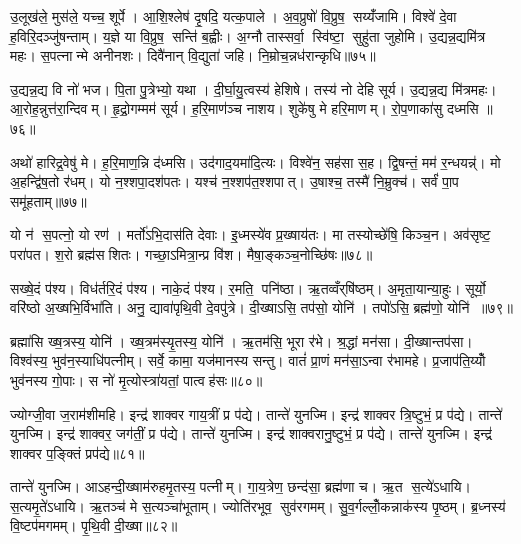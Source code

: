 उ॒लूख॑ले॒ मुस॑ले॒ यच्च॒ शूर्पे। आ॒शि॒श्लेष॑ दृ॒षदि॒ यत्क॒पाले। अ॒व॒प्रुषो॑ वि॒प्रुष॒ सय्यँ॑जामि। विश्वे॑ दे॒वा ह॒विरि॒दञ्जु॑षन्ताम्। य॒ज्ञे या वि॒प्रुष॒ सन्ति॑ ब॒ह्वीः। अ॒ग्नौ तास्सर्वा॒ स्वि॑ष्टा॒ सुहु॑ता जुहोमि। उ॒द्यन्न॒द्यमि॑त्र महः। स॒पत्नान्मे अनीनशः। दिवै॑नान् वि॒द्युता॑ जहि। नि॒म्रोच॒न्नध॑रान्कृधि॥७५॥

उ॒द्यन्न॒द्य वि नो॑ भज। पि॒ता पु॒त्रेभ्यो॒ यथा। दी॒र्घा॒यु॒त्वस्य॑ हेशिषे। तस्य॑ नो देहि सूर्य। उ॒द्यन्न॒द्य मि॑त्रमहः। आ॒रोह॒न्नुत्त॑रा॒न्दिवम्। हृ॒द्रो॒गम्मम॑ सूर्य। ह॒रि॒माण॑ञ्च नाशय। शुके॑षु मे हरि॒माणम्। रो॒प॒णाका॑सु दध्मसि ॥७६॥

अथो॑ हारिद्र॒वेषु॑ मे। ह॒रि॒माण॒न्नि द॑ध्मसि। उद॑गाद॒यमा॑दि॒त्यः। विश्वे॑न॒ सह॑सा स॒ह। द्वि॒षन्तं॒ मम॑ र॒न्धयन्न्॑। मो अ॒हन्द्वि॑ष॒तो र॑धम्। यो न॒श्शपा॒दश॑पतः। यश्च॑ न॒श्शप॑त॒श्शपात्। उ॒षाश्च॒ तस्मै॑ नि॒म्रुक्च॑। सर्वं॑ पा॒प समू॑हताम्॥७७॥

यो न॑ स॒पत्नो॒ यो रण॑। मर्तो॑ऽभि॒दास॑ति देवाः। इ॒ध्मस्ये॑व प्र॒ख्षाय॑तः। मा तस्योच्छे॑षि॒ किञ्च॒न। अव॑सृष्ट॒ परा॑पत। श॒रो ब्रह्म॑सशितः। गच्छा॒ऽमित्रा॒न्प्र वि॑श। मैषा॒ङ्कञ्च॒नोच्छि॑षः॥७८॥\anuvakamend[पति॑ प्र॒जाप॑तये तप॒स्वी वा॒चा सौभ॑गाय प॒शून्मे॑ पिन्वस्व दुर्मरा॒युन्दे॑व॒याना॑नग्ने॒ऽन्तरि॑ख्षे॒ऽहमुत्त॑रो भूयासं प्र॒जाप॑तिरसि स॒र्वत॑श्श्रि॒तः प्रवि॑ष्टन्दे॒वता॑भिर्वाज॒जितं॑ पृथि॒वी ह्व॑यताम॒ग्निराग्नीध्राद्वृश्चत ससृ॒वास हु॒ते स्यो॒नेन॑ मे॒ सन्ति॑ष्ठस्वे॒तः कृ॑धि दध्मस्यूहताम॒ष्टौ च॑]

सख्षे॒दं प॑श्य। विध॑र्तरि॒दं प॑श्य। नाके॒दं प॑श्य। र॒मति॒ पनि॑ष्ठा। ऋ॒तव्वँर्‌षि॑ष्ठम्। अ॒मृता॒यान्या॒हुः। सूर्यो॒ वरि॑ष्ठो अ॒ख्षभि॒र्विभा॑ति। अनु॒ द्यावा॑पृथि॒वी दे॒वपु॑त्रे। दी॒ख्षाऽसि॒ तप॑सो॒ योनि॑। तपो॑ऽसि॒ ब्रह्म॑णो॒ योनि॑ ॥७९॥

ब्रह्मा॑सि ख्ष॒त्रस्य॒ योनि॑। ख्ष॒त्रम॑स्यृ॒तस्य॒ योनि॑। ऋ॒तम॑सि॒ भूरा र॑भे। श्र॒द्धां मन॑सा। दी॒ख्षान्तप॑सा। विश्व॑स्य॒ भुव॑न॒स्याधि॑पत्नीम्। सर्वे॒ कामा॒ यज॑मानस्य सन्तु। वातं॑ प्रा॒णं मन॑सा॒ऽन्वा र॑भामहे। प्र॒जाप॑ति॒य्योँ भुव॑नस्य गो॒पाः। स नो॑ मृ॒त्योस्त्रा॑यतां॒ पात्वह॑सः॥८०॥

ज्योग्जी॒वा ज॒राम॑शीमहि। इन्द्र॑ शाक्वर गाय॒त्रीं प्र प॑द्ये। तान्ते॑ युनज्मि। इन्द्र॑ शाक्वर त्रि॒ष्टुभं॒ प्र प॑द्ये। तान्ते॑ युनज्मि। इन्द्र॑ शाक्वर॒ जग॑तीं॒ प्र प॑द्ये। तान्ते॑ युनज्मि। इन्द्र॑ शाक्वरानु॒ष्टुभं॒ प्र प॑द्ये। तान्ते॑ युनज्मि। इन्द्र॑ शाक्वर प॒ङ्क्तिं प्रप॑द्ये॥८१॥

तान्ते॑ युनज्मि। आऽहन्दी॒ख्षाम॑रुहमृ॒तस्य॒ पत्नीम्। गा॒य॒त्रेण॒ छन्द॑सा॒ ब्रह्म॑णा च। ऋ॒त स॒त्ये॑ऽधायि। स॒त्यमृ॒ते॑ऽधायि। ऋ॒तञ्च॑ मे स॒त्यञ्चा॑भूताम्। ज्योति॑रभूव॒ सुव॑रगमम्। सु॒व॒र्गल्लोँ॒कन्नाक॑स्य पृ॒ष्ठम्। ब्र॒ध्नस्य॑ वि॒ष्टप॑मगमम्। पृ॒थि॒वी दी॒ख्षा॥८२॥

